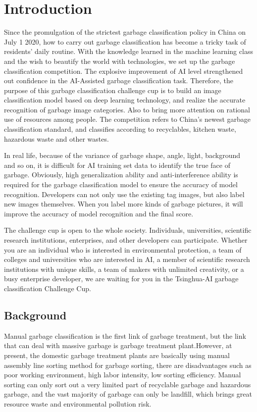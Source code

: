 \section{Introduction}

Since the promulgation of the strictest garbage classification policy in China on July 1 2020, how to carry out garbage classification has become a tricky task of  residents' daily routine. With the knowledge learned in the machine learning class and the wish to beautify the world with technologies, we set up the garbage classification competition. The explosive improvement of AI level strengthened out confidence in the AI-Assisted garbage classification task. Therefore, the purpose of this garbage classification challenge cup is to build an image classification model based on deep learning technology, and realize the accurate recognition of garbage image categories. Also to bring more attention on rational use of resources among people. The competition refers to China's newest garbage classification standard, and classifies according to recyclables, kitchen waste, hazardous waste and other wastes.

In real life, because of the variance of garbage shape, angle, light, background and so on, it is difficult for AI training set data to identify the true face of garbage. Obviously, high generalization ability and anti-interference ability is required for the garbage classification model to ensure the accuracy of model recognition. Developers can not only use the existing tag images, but also label new images themselves. When you label more kinds of garbage pictures, it will improve the accuracy of model recognition and the final score.

The challenge cup is open to the whole society. Individuals, universities, scientific research institutions, enterprises, and other developers can participate. Whether you are an individual who is interested in environmental protection, a team of colleges and universities who are interested in AI, a member of scientific research institutions with unique skills, a team of makers with unlimited creativity, or a busy enterprise developer, we are waiting for you in the Tsinghua-AI garbage classification Challenge Cup.

\subsection{Background}

Manual garbage classification is the first link of garbage treatment, but the link that can deal with massive garbage is garbage treatment plant.However, at present, the domestic garbage treatment plants are basically using manual assembly line sorting method for garbage sorting, there are disadvantages such as poor working environment, high labor intensity, low sorting efficiency. Manual sorting can only sort out a very limited part of recyclable garbage and hazardous garbage, and the vast majority of garbage can only be landfill, which brings great resource waste and environmental pollution risk.

